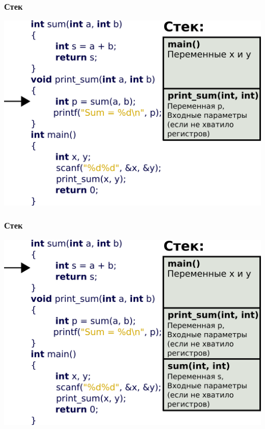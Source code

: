 \documentclass[12pt,pdf,hyperref={unicode}]{beamer}
\begin{document}
\begin{frame}[fragile]
\frametitle{Стек} 
\begin{center}
\includegraphics[width=\linewidth]{images/stack2.png}
\end{center}
\end{frame}

\begin{frame}[fragile]
\frametitle{Стек} 
\begin{center}
\includegraphics[width=\linewidth]{images/stack3.png}
\end{center}
\end{frame}
\end{document}

